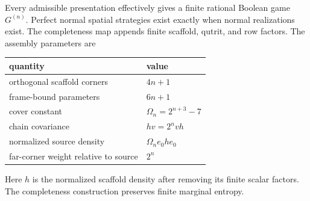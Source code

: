 \begin{lemma}\label{lem:compiler}
Every admissible presentation effectively gives a finite rational Boolean game $G^{(n)}$. Perfect normal spatial strategies exist exactly when normal realizations exist. The completeness map appends finite scaffold, qutrit, and row factors. The assembly parameters are
\begin{center}
\begin{tabular}{@{}ll@{}}\toprule
quantity&value\\\midrule
orthogonal scaffold corners&$4n+1$\\
frame-bound parameters&$6n+1$\\
cover constant&$\Omega_n=2^{n+3}-7$\\
chain covariance&$hv=2^n vh$\\
normalized source density&$\Omega_n e_0he_0$\\
far-corner weight relative to source&$2^n$\\\bottomrule
\end{tabular}
\end{center}
Here $h$ is the normalized scaffold density after removing its finite scalar factors. The completeness construction preserves finite marginal entropy.
\end{lemma}
